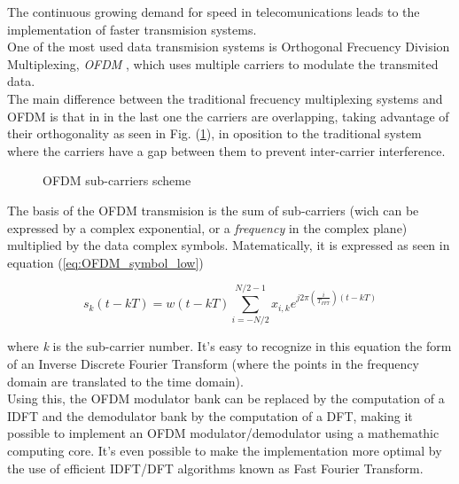 \documentclass[conference]{IEEEtran}
\begin{document}
The continuous growing demand for speed in telecomunications leads to the implementation of faster transmision systems.\\
One of the most used data transmision systems is Orthogonal Frecuency Division Multiplexing, \textit{OFDM} \cite{Prasad2_1}, which uses multiple carriers 
to modulate the transmited data.\\
The main difference between the traditional frecuency multiplexing systems and OFDM is 
that in in the last one the carriers are overlapping, taking advantage of their orthogonality as seen in Fig. (\ref{ofdm_carriers}), 
in oposition to the traditional system where the carriers have a gap between them to prevent inter-carrier interference.\\

\begin{figure}[htb!]
\begin{minipage}[b]{1.0\linewidth}\centering
{}
\end{minipage}
\caption{OFDM sub-carriers scheme}
\label{ofdm_carriers}
\end{figure}

The basis of the OFDM transmision is the sum of sub-carriers (wich can be expressed by a complex exponential, or a \textit{frequency}
in the complex plane) multiplied by the data complex symbols. Matematically, it is expressed as seen in equation (\ref{eq:OFDM_symbol_low})

\begin{equation}
s_{k}(t-kT) =
	w(t-kT) \sum\limits_{i=-N/2}^{N/2-1} x_{i,k} e^{j2\pi
	\left(\frac{i}{T_{FFT}}\right)(t-kT)}
\label{eq:OFDM_symbol_low}
\end{equation}

where \textit{k} is the sub-carrier number. It's easy to recognize in this equation the form of an Inverse Discrete Fourier Transform 
(where the points in the frequency domain are translated to the time domain).\\
Using this, the OFDM modulator bank can be replaced by the computation of a IDFT and the demodulator bank by the computation of a
DFT, making it possible to implement an OFDM modulator/demodulator using a mathemathic computing core. It's even possible to make the 
implementation more optimal by the use of efficient IDFT/DFT algorithms known as Fast Fourier Transform.\\
\end{document}
